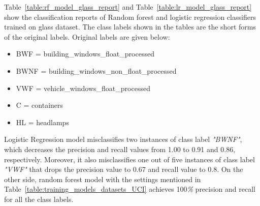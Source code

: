 \documentclass[english]{tktltiki2}
\theoremstyle{definition}
\theoremstyle{remark}
\begin{document}
Table~\ref{table:rf_model_glass_report} and Table~\ref{table:lr_model_glass_report} show the classification reports of Random forest and logistic regression classifiers trained on glass dataset. The class labels shown in the tables are the short forms of the original labels. Original labels are given below:
\begin{itemize}
	\item BWF = building\_windows\_float\_processed
	\item BWNF = building\_windows\_non\_float\_processed
	\item VWF = vehicle\_windows\_float\_processed
	\item C = containers
	\item HL = headlamps
\end{itemize}

Logistic Regression model misclassifies two instances of class label \textit{"BWNF"}, which decreases the precision and recall values from 1.00 to 0.91 and 0.86, respectively. Moreover, it also misclassifies one out of five instances of class label \textit{"VWF"} that drops the precision value to 0.67 and recall value to 0.8. On the other side, random forest model with the settings mentioned in Table~\ref{table:training_models_datasets_UCI} achieves 100\textit{\%} precision and recall for all the class labels. 
\end{document}
